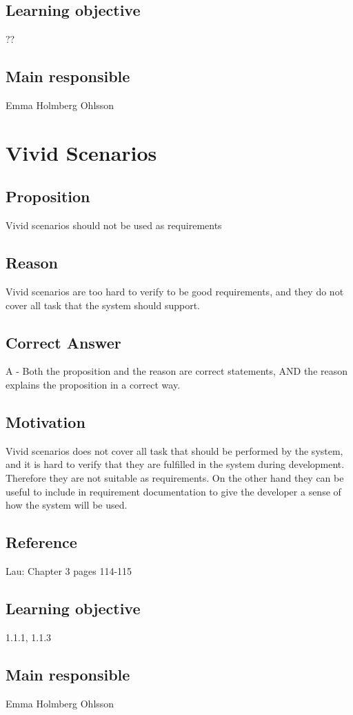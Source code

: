 \documentclass[a4paper]{article}
\begin{document}
\subsection*{Learning objective}
??
\subsection*{Main responsible}
Emma Holmberg Ohlsson


\section{Vivid Scenarios}
\subsection*{Proposition}
Vivid scenarios should not be used as requirements
\subsection*{Reason}
Vivid scenarios are too hard to verify to be good requirements, and they do not cover all task that the system should support.
\subsection*{Correct Answer}
A - Both the proposition and the reason are correct statements, AND the reason explains the proposition in a correct way.
\subsection*{Motivation}
Vivid scenarios does not cover all task that should be performed by the system, and it is hard to verify that they are fulfilled in the system during development. Therefore they are not suitable as requirements. On the other hand they can be useful to include in requirement documentation to give the developer a sense of how the system will be used.
\subsection*{Reference}
Lau: Chapter 3 pages 114-115
\subsection*{Learning objective}
1.1.1, 1.1.3
\subsection*{Main responsible}
Emma Holmberg Ohlsson
\end{document}
